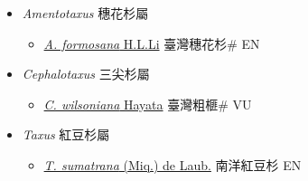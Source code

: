 
  \begin{itemize}
 \item[] \textit{Amentotaxus} 穗花杉屬
                    
  \begin{itemize}
        \item[] \href{http://www.theplantlist.org/tpl1.1/search?q=Amentotaxus+formosana}{\textit{A. formosana} H.L.Li}   臺灣穗花杉\# EN
  \end{itemize}
 \item[] \textit{Cephalotaxus} 三尖杉屬
                    
  \begin{itemize}
        \item[] \href{http://www.theplantlist.org/tpl1.1/search?q=Cephalotaxus+wilsoniana}{\textit{C. wilsoniana} Hayata}   臺灣粗榧\# VU
  \end{itemize}
 \item[] \textit{Taxus} 紅豆杉屬
                    
  \begin{itemize}
        \item[] \href{http://www.theplantlist.org/tpl1.1/search?q=Taxus+sumatrana}{\textit{T. sumatrana} (Miq.) de Laub.}   南洋紅豆杉 EN
  \end{itemize}
  \end{itemize}

